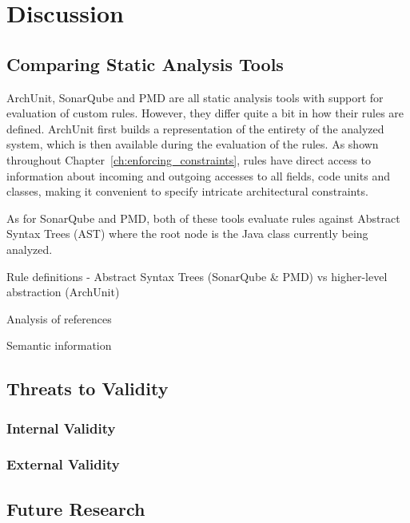 \chapter{Discussion}


\section{Comparing Static Analysis Tools}
ArchUnit, SonarQube and PMD are all static analysis tools with support for evaluation of custom rules. However, they differ quite a bit in how their rules are defined. ArchUnit first builds a representation of the entirety of the analyzed system, which is then available during the evaluation of the rules. As shown throughout Chapter~\ref{ch:enforcing_constraints}, rules have direct access to information about incoming and outgoing accesses to all fields, code units and classes, making it convenient to specify intricate architectural constraints.

As for SonarQube and PMD, both of these tools evaluate rules against Abstract Syntax Trees (AST) where the root node is the Java class currently being analyzed.

Rule definitions - Abstract Syntax Trees (SonarQube \& PMD) vs higher-level abstraction (ArchUnit)

Analysis of references

Semantic information

\section{Threats to Validity}

\subsection{Internal Validity}

\subsection{External Validity}

\section{Future Research}


